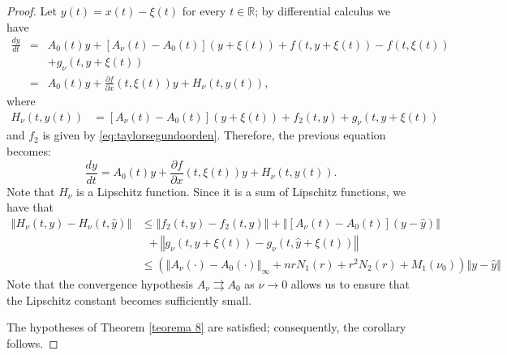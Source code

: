 \documentclass[english,reqno]{amsart}
\numberwithin{equation}{section}
\theoremstyle{plain}
\theoremstyle{definition}
\theoremstyle{remark}
\begin{document}
\begin{proof}
Let $y\left(t\right)=x\left(t\right)-\xi\left(t\right)$ for every $t\in\mathbb{R}$;
by differential calculus we have
\begin{eqnarray*}
\frac{dy}{dt} & = & A_{0}\left(t\right)y+\left[A_{\nu}\left(t\right)-A_{0}\left(t\right)\right]\left(y+\xi\left(t\right)\right)+f\left(t,y+\xi\left(t\right)\right)-f\left(t,\xi\left(t\right)\right)\\
& &+ g_{\nu}\left(t,y+\xi\left(t\right)\right)\\
 & = & A_{0}\left(t\right)y+\frac{\partial f}{\partial x}\left(t,\xi\left(t\right)\right)y+H_{\nu}\left(t,y\left(t\right)\right),
\end{eqnarray*}
where
\begin{align}
H_{\nu}\left(t,y\left(t\right)\right) & =\left[A_{\nu}\left(t\right)-A_{0}\left(t\right)\right]\left(y+\xi\left(t\right)\right)+f_{2}\left(t,y\right)+ g_{\nu}\left(t,y+\xi\left(t\right)\right)\label{eq:H_v-1}
\end{align}
and $f_{2}$ is given by \eqref{eq:taylorsegundoorden}. Therefore, the previous equation becomes:
\[
\frac{dy}{dt}=A_{0}\left(t\right)y+\frac{\partial f}{\partial x}\left(t,\xi\left(t\right)\right)y+H_{\nu}\left(t,y\left(t\right)\right).
\]
Note that $H_{\nu}$ is a Lipschitz function. Since it is a sum of Lipschitz functions, we have that
\begin{align*}
\left\Vert H_{\nu}\left(t,y\right)-H_{\nu}\left(t,\hat{y}\right)\right\Vert  
& \leq\left\Vert f_{2}\left(t,y\right)-f_{2}\left(t,\hat{y}\right)\right\Vert +\left\Vert \left[A_{\nu}\left(t\right)-A_{0}\left(t\right)\right]\left(y-\hat{y}\right)\right\Vert \\
 & \,\,\,+\left\Vert  g_{\nu}\left(t,y+\xi\left(t\right)\right)- g_{\nu}\left(t,\hat{y}+\xi\left(t\right)\right)\right\Vert \\
 & \leq\left(\left\Vert A_{\nu}\left(\cdot \right)-A_{0}\left(\cdot\right)\right\Vert_{\infty} +nrN_{1}\left(r\right)+r^{2}N_{2}\left(r\right)+M_{1}\left(\nu_{0}\right)\right)\left\Vert y-\hat{y}\right\Vert 
\end{align*}
Note that the convergence hypothesis $A_{\nu} \rightrightarrows A_{0}$ as $\nu\rightarrow 0$
allows us to ensure that the Lipschitz constant becomes sufficiently small.

The hypotheses of Theorem \ref{teorema 8} are satisfied; consequently, the corollary follows.

\end{proof}
\end{document}
